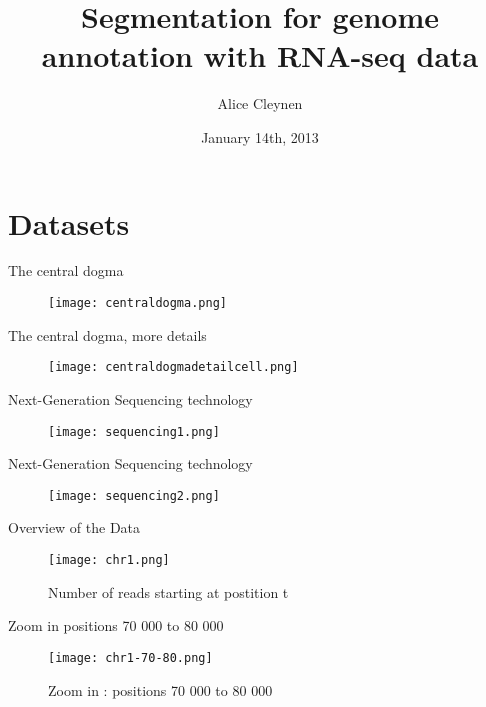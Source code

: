 \documentclass[a4paper]{beamer}
\title[]{Segmentation for genome annotation with RNA-seq data}
\subtitle{}
\author[A. Cleynen]%
{Alice Cleynen}
\institute[AgroParisTech]{}
\date[January 2013] 
{January 14th, 2013}
\begin{document}


\begin{frame}
  \titlepage
\end{frame}

\section{Datasets}

\begin{frame}{The central dogma}
 \begin{figure}
  \texttt{[image: centraldogma.png]}
 \end{figure}
\end{frame}

\begin{frame}{The central dogma, more details}
 \begin{figure}
  \texttt{[image: centraldogmadetailcell.png]}
 \end{figure}
\end{frame}



\begin{frame}{Next-Generation Sequencing technology}
 \begin{figure}
  \texttt{[image: sequencing1.png]}
 \end{figure}
\end{frame}

\begin{frame}{Next-Generation Sequencing technology}
 \begin{figure}
  \texttt{[image: sequencing2.png]}
 \end{figure}
\end{frame}


\begin{frame}{Overview of the Data}
 \begin{figure}
 \texttt{[image: chr1.png]}
  \caption{Number of reads starting at postition t}
 \end{figure}
\end{frame}

\begin{frame}{Zoom in positions 70 000 to 80 000}
 \begin{figure}
  \texttt{[image: chr1-70-80.png]}
  \caption{Zoom in : positions 70 000 to 80 000}
 \end{figure}
\end{frame}
\end{document}
